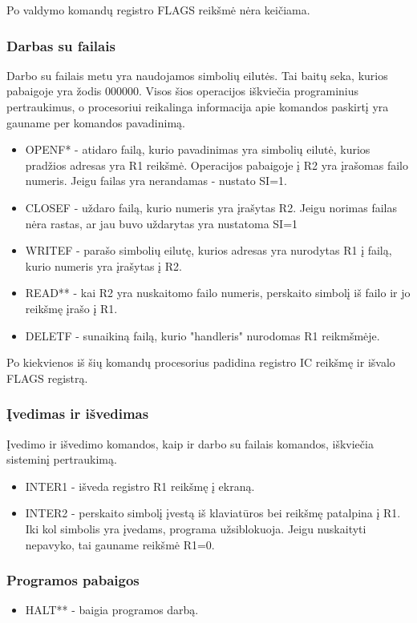 \documentclass{VUMIFInfKursinis}
\begin{document}
Po valdymo komandų registro FLAGS reikšmė nėra keičiama.

\subsubsection{Darbas su failais}
Darbo su failais metu yra naudojamos simbolių eilutės. Tai baitų seka, kurios pabaigoje yra žodis 000000. Visos šios operacijos iškviečia programinius pertraukimus, o procesoriui reikalinga informacija apie komandos paskirtį yra gauname per komandos pavadinimą.
\begin{itemize}
	\item OPENF* - atidaro failą, kurio pavadinimas yra simbolių eilutė, kurios pradžios adresas yra R1 reikšmė. Operacijos pabaigoje į R2 yra įrašomas failo numeris. Jeigu failas yra nerandamas - nustato SI=1.
	\item CLOSEF - uždaro failą, kurio numeris yra įrašytas  R2. Jeigu norimas failas nėra rastas, ar jau buvo uždarytas yra nustatoma SI=1
	\item WRITEF - parašo simbolių eilutę, kurios adresas yra nurodytas R1 į failą, kurio numeris yra įrašytas į R2.
	\item READ** - kai R2 yra nuskaitomo failo numeris, perskaito simbolį iš failo ir jo reikšmę įrašo į R1.
	\item DELETF - sunaikiną failą, kurio "handleris" nurodomas R1 reikmšmėje.
\end{itemize}

Po kiekvienos iš šių komandų procesorius padidina registro IC reikšmę ir išvalo FLAGS registrą.

\subsubsection{Įvedimas ir išvedimas}
Įvedimo ir išvedimo komandos, kaip ir darbo su failais komandos, iškviečia sisteminį pertraukimą.
\begin{itemize}
	\item INTER1 - išveda registro R1 reikšmę į ekraną.
	\item INTER2 - perskaito simbolį įvestą iš klaviatūros bei reikšmę patalpina į R1. Iki kol simbolis yra įvedams, programa užsiblokuoja. Jeigu nuskaityti nepavyko, tai gauname reikšmė R1=0.
\end{itemize}

\subsubsection{Programos pabaigos}
\begin{itemize}
	\item HALT** - baigia programos darbą.
\end{itemize}
\end{document}
